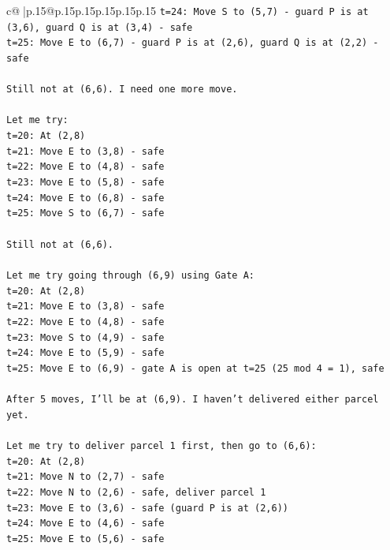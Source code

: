 \documentclass{article}
\begin{document}
{\begin{supertabular}{c@{$\;$}|p{.15\linewidth}@{}p{.15\linewidth}p{.15\linewidth}p{.15\linewidth}p{.15\linewidth}p{.15\linewidth}}
{{{\texttt{t=24: Move S to (5,7) {-} guard P is at (3,6), guard Q is at (3,4) {-} safe} \\
\texttt{t=25: Move E to (6,7) {-} guard P is at (2,6), guard Q is at (2,2) {-} safe} \\
\\ 
\texttt{Still not at (6,6). I need one more move.} \\
\\ 
\texttt{Let me try:} \\
\texttt{t=20: At (2,8)} \\
\texttt{t=21: Move E to (3,8) {-} safe} \\
\texttt{t=22: Move E to (4,8) {-} safe} \\
\texttt{t=23: Move E to (5,8) {-} safe} \\
\texttt{t=24: Move E to (6,8) {-} safe} \\
\texttt{t=25: Move S to (6,7) {-} safe} \\
\\ 
\texttt{Still not at (6,6). } \\
\\ 
\texttt{Let me try going through (6,9) using Gate A:} \\
\texttt{t=20: At (2,8)} \\
\texttt{t=21: Move E to (3,8) {-} safe} \\
\texttt{t=22: Move E to (4,8) {-} safe} \\
\texttt{t=23: Move S to (4,9) {-} safe} \\
\texttt{t=24: Move E to (5,9) {-} safe} \\
\texttt{t=25: Move E to (6,9) {-} gate A is open at t=25 (25 mod 4 = 1), safe} \\
\\ 
\texttt{After 5 moves, I'll be at (6,9). I haven't delivered either parcel yet.} \\
\\ 
\texttt{Let me try to deliver parcel 1 first, then go to (6,6):} \\
\texttt{t=20: At (2,8)} \\
\texttt{t=21: Move N to (2,7) {-} safe} \\
\texttt{t=22: Move N to (2,6) {-} safe, deliver parcel 1} \\
\texttt{t=23: Move E to (3,6) {-} safe (guard P is at (2,6))} \\
\texttt{t=24: Move E to (4,6) {-} safe} \\
\texttt{t=25: Move E to (5,6) {-} safe} \\
}}}
\end{supertabular}}
\end{document}
